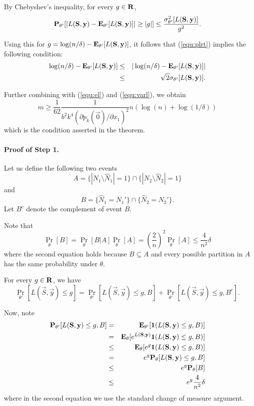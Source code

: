 By Chebyshev's inequality, for every $g\in \mathbf{R}$,
$$
\mathbf{P}_{\theta'}[|L(\mathbf{S},\mathbf{y})-\mathbf{E}_{\theta'}[L(\mathbf{S},\mathbf{y})]| \geq |g|] \leq \frac{\sigma^2_{\theta'}[L(\mathbf{S},\mathbf{y})]}{g^2}.
$$

Using this for  $g = \log(n/\delta)-\mathbf{E}_{\theta'}[L(\mathbf{S},\mathbf{y})]$, it follows that (\ref{equ:plrt}) implies the following condition:
\begin{eqnarray*}
\log (n/\delta) - \mathbf{E}_{\theta'}[L(\mathbf{S},\mathbf{y})]  & \le &  |\log (n/\delta) - \mathbf{E}_{\theta'}[L(\mathbf{S},\mathbf{y})]|\\
& \leq & \sqrt{2} \sigma_{\theta'}[L(\mathbf{S},\mathbf{y})].
\end{eqnarray*}

Further combining with (\ref{equ:el}) and (\ref{equ:varl}), we obtain
$$
m \geq \frac{1}{62}\frac{1}{b^2 k^4 (\partial p_k(\vec{0})/\partial x_1)^2} n(\log(n) + \log(1/\delta))
$$
which is the condition asserted in the theorem.

\paragraph{Proof of Step 1.} Let us define the following two events 
$$
A = \{|N_1\setminus \widehat N_1| = 1\} \cap \{|N_2 \setminus \widehat N_2| = 1\}
$$
and
$$
B = \{\widehat N_1 = N_1'\} \cap \{\widehat N_2 = N_2'\}.
$$
Let $B^c$ denote the complement of event $B$.

Note that
$$
\Pr_{\theta}[B] = \Pr_{\theta}[B|A] \Pr_\theta[A]
= \left(\frac{2}{n} \right)^2 \Pr_{\theta}[A]
\le \frac{4}{n^2} \delta
$$
where the second equation holds because $B \subseteq A$ and every possible partition in $A$ has the same probability under $\theta$.

For every $g\in \mathbf{R}$, we have
$$
\Pr_{\theta'}[L(\vec{S},\vec{y}) \le g] =  \Pr_{\theta'}[L(\vec{S},\vec{y}) \le g,B] + \Pr_{\theta'}[L(\vec{S},\vec{y}) \le g, B^c].
$$

Now, note
\begin{eqnarray*}
\mathbf{P}_{\theta'} [L(\mathbf{S},\mathbf{y}) \le  g , B] &= & \mathbf{E}_{\theta'}[\mathbf{1}(L(\mathbf{S},\mathbf{y})\leq g,B)]\\
&= & \mathbf{E}_\theta[e^{L(\mathbf{S},\mathbf{y})}\mathbf{1}(L(\mathbf{S},\mathbf{y})\leq g,B)]\\
&\le & \mathbf{E}_\theta[e^{g}\mathbf{1}(L(\mathbf{S},\mathbf{y})\leq g,B)]\\
&=& e^g \mathbf{P}_{\theta}[L(\mathbf{S},\mathbf{y})\leq g, B]\\
&\le & e^g \mathbf{P}_{\theta}[B]\\
&\le & e^g\frac{4}{n^2}\delta
\label{eq:bdl-1} 
\end{eqnarray*}
where in the second equation we use the standard change of measure argument.

